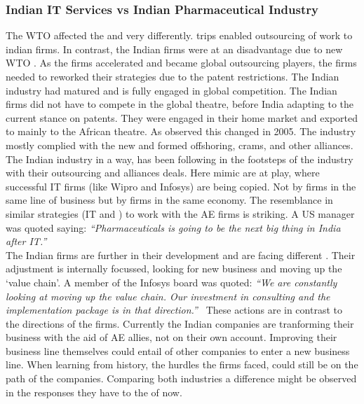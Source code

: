 \subsubsection{Indian IT Services vs Indian Pharmaceutical Industry}
The WTO \rr affected the \pharma and \its very differently.
\Gls{trips} enabled outsourcing of work to indian \its firms.
In contrast, the Indian \pharma firms were at an disadvantage due to new WTO \rr.
As the \its firms accelerated and became global outsourcing players, the \pharma firms needed to reworked their strategies due to the patent restrictions.
The Indian \its industry had matured and is fully engaged in global competition.
The Indian \pharma firms did not have to compete in the global theatre, before India adapting to the current stance on patents.
They were engaged in their home market and exported to mainly to the African theatre.
As observed this changed in 2005.
The industry mostly complied with the new \rr and formed offshoring, \gls{crams}, and other alliances.
The Indian \pharma industry in a way, has been following in the footsteps of the \its industry with their outsourcing and alliances deals.
Here mimic \iso are at play, where successful IT firms (like Wipro and Infosys) are being copied.
Not by firms in the same line of business but by \pharma firms in the same economy.
The resemblance in similar strategies (IT and \pharma) to work with the AE firms is striking.
A US \pharma manager was quoted saying: \emph{``Pharmaceuticals is going to be the next big thing in India after IT.''}~\citep{TELEGRAPH:2004}\\
The Indian \its firms are further in their development and are facing different \cc.
Their adjustment is internally focussed, looking for new business and moving up the `value chain'.
A member of the Infosys board was quoted: \emph{``We are constantly looking at moving up the value chain. Our investment in consulting and the implementation package is in that direction.''}~\citep{Economic-Times:2011}
These actions are in contrast to the directions of the \pharma firms.
Currently the Indian \pharma companies are tranforming their business with the aid of AE allies, not on their own account.
Improving their business line themselves could entail \acq of other companies to enter a new business line.
When learning from history, the hurdles the \its firms faced, could still be on the path of the \pharma companies.
Comparing both industries a difference might be observed in the responses they have to the \cc of now.


  